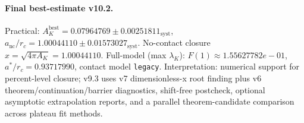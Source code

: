 \paragraph{Final best-estimate v10.2.}
Practical: $A_K^{\mathrm{best}} = 0.07964769 \pm 0.00251811_{\mathrm{syst}}$, $a_{\mathrm{nc}}/r_c = 1.00044110 \pm 0.01573027_{\mathrm{syst}}$.
No-contact closure $x = \sqrt{4\pi A_K} = 1.00044110$.
Full-model (max $\lambda_K$): $F(1) \approx 1.55627782e-01$, $a^*/r_c = 0.93717990$, contact model \texttt{legacy}.
Interpretation: numerical support for percent-level closure; v9.3 uses v7 dimensionless-x root finding plus v6 theorem/continuation/barrier diagnostics, shift-free postcheck, optional asymptotic extrapolation reports, and a parallel theorem-candidate comparison across plateau fit methods.
